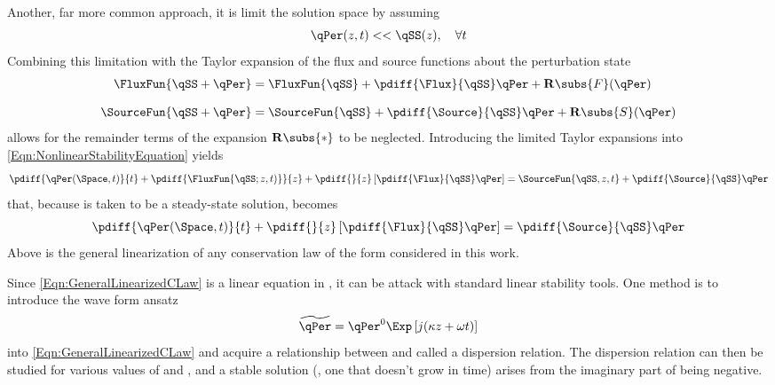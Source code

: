 Another, far more common approach, it is limit the solution space by assuming
\begin{equation}
    \qPer(z,t) << \qSS(z),\quad\forall{t}
    \label{Eqn:LinearizationAssumption}
\end{equation}
Combining this limitation with the Taylor expansion of the flux and source functions about the perturbation state
\begin{align}
    \FluxFun {\qSS + \qPer} &= \FluxFun{\qSS}   + \pdiff{\Flux}  {\qSS} \qPer + \mathbf{R}\subs{F}(\qPer) \\[0.8em]
    \SourceFun{\qSS + \qPer} &= \SourceFun{\qSS} + \pdiff{\Source}{\qSS} \qPer + \mathbf{R}\subs{S}(\qPer)
\end{align}
allows for the remainder terms of the expansion $\mathbf{R}\subs{*}$ to be neglected.
Introducing the limited Taylor expansions into \cref{Eqn:NonlinearStabilityEquation} yields
\begin{equation}
    \pdiff{\qPer(\Space,t)}{t}  + \pdiff{\FluxFun{\qSS;z,t)}}{z} + \pdiff{}{z}\left[\pdiff{\Flux}{\qSS}\qPer\right] = 
    \SourceFun{\qSS,z,t} + \pdiff{\Source}{\qSS}\qPer
\end{equation}
that, because \qSS is taken to be a steady-state solution, becomes
\begin{equation}
    \pdiff{\qPer(\Space,t)}{t}  + \pdiff{}{z}\left[\pdiff{\Flux}{\qSS}\qPer\right] = \pdiff{\Source}{\qSS}\qPer
    \label{Eqn:GeneralLinearizedCLaw}
\end{equation}
Above is the general linearization of any conservation law of the form considered in this work.

Since \cref{Eqn:GeneralLinearizedCLaw} is a linear equation in \qPer, it can be attack with standard linear stability tools.
One method is to introduce the wave form ansatz
\begin{equation}
    \widetilde{\qPer} = \qPer^0 \Exp\left[j(\kappa z + \omega t)\right]
    \label{Eqn:WaveForm}
\end{equation}
into \cref{Eqn:GeneralLinearizedCLaw} and acquire a relationship between \omega and \kappa called a dispersion relation.
The dispersion relation can then be studied for various values of \omega and \kappa, and a stable solution (\ie, one that doesn't grow in time) arises from the imaginary part of \omega being negative.

